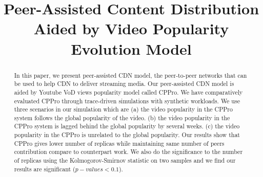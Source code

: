 \documentclass[10pt,final,journal,a4paper]{IEEEtran}
\begin{document}
%
\title{Peer-Assisted Content Distribution Aided by Video Popularity Evolution Model}

\author{
 \quad
{}
}








\maketitle


\begin{abstract}
In this paper, we present peer-assisted CDN model, the peer-to-peer networks that can be used to help CDN to deliver streaming media.
Our peer-assisted CDN model is aided by Youtube VoD views popularity model called CPPro.
We have comparatively evaluated CPPro through trace-driven simulations with synthetic workloads.
We use three scenarios in our simulation which are 
(a) the video popularity in the CPPro system follows the global popularity of the video.
(b) the video popularity in the CPPro system is lagged behind the global popularity by several weeks.
(c) the video popularity in the CPPro is unrelated to the global popularity.
Our results show that CPPro gives lower number of replicas while maintaining same number of peers contribution compare to counterpart work. 
We also do the significance to the number of replicas using the Kolmogorov-Smirnov statistic on two samples and we find our results are significant ($p-values < 0.1$). 

\end{abstract}
\end{document}
